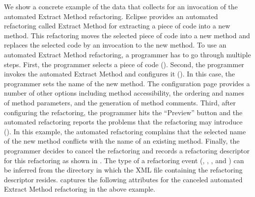 We show a concrete example of the data that \CodingSpectator{} collects for an
invocation of the automated Extract Method refactoring. Eclipse provides an
automated refactoring called Extract Method for extracting a piece of code into
a new method. This refactoring moves the selected piece of code into a new
method and replaces the selected code by an invocation to the new method. To use
an automated Extract Method refactoring, a programmer has to go through multiple
steps. First, the programmer selects a piece of code
(). Second, the
programmer invokes the automated Extract Method and configures it
(). In this case,
the programmer sets the name of the new method. The configuration page provides
a number of other options including method accessibility, the ordering and names
of method parameters, and the generation of method comments. Third, after
configuring the refactoring, the programmer hits the ``Preview'' button and the
automated refactoring reports the problems that the refactoring may introduce
(). In this example, the
automated refactoring complains that the selected name of the new method
conflicts with the name of an existing method. Finally, the programmer decides
to cancel the refactoring and \CodingSpectator{} records a refactoring
descriptor for this \Canceled{} refactoring as shown in
. The type of a refactoring event
(\ie, \Unavailable, \Canceled, and \Performed) can be inferred from the
directory in which the XML file containing the refactoring descriptor resides.
\CodingSpectator{} captures the following attributes for the canceled automated
Extract Method refactoring in the above example.

